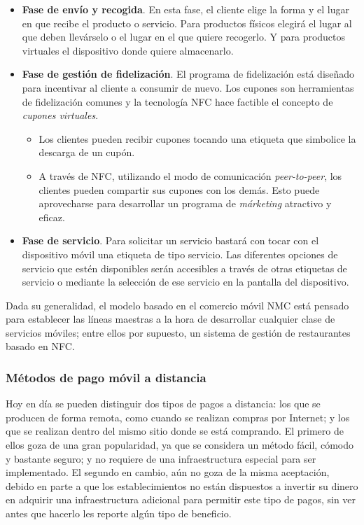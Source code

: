 \begin{itemize}
\begin{itemize}
    \end{itemize}
  \item \textbf{Fase de envío y recogida}. En esta fase, el cliente elige
  la forma y el lugar en que recibe el producto o servicio. Para productos
  físicos elegirá el lugar al que deben llevárselo o el lugar en el que quiere
  recogerlo. Y para productos virtuales el dispositivo donde quiere
  almacenarlo.
  \item \textbf{Fase de gestión de fidelización}. El programa de fidelización
  está diseñado para incentivar al cliente a consumir de nuevo. Los cupones son
  herramientas de fidelización comunes y la tecnología \acs{NFC} hace factible
  el concepto de \emph{cupones virtuales}.
    \begin{itemize}
    \item Los clientes pueden recibir cupones tocando una etiqueta que 
    simbolice la descarga de un cupón.
    \item A través de \acs{NFC}, utilizando el modo de comunicación
    \emph{peer-to-peer}, los clientes pueden compartir sus cupones con los
    demás. Esto puede aprovecharse para desarrollar un programa de
    \emph{márketing} atractivo y eficaz.
    \end{itemize}
  \item \textbf{Fase de servicio}. Para solicitar un servicio bastará con
  tocar con el dispositivo móvil una etiqueta de tipo servicio. Las diferentes
  opciones de servicio que estén disponibles serán accesibles a través de
  otras etiquetas de servicio o mediante la selección de ese servicio en la
  pantalla del dispositivo.
  \end{itemize}
  
  Dada su generalidad, el modelo basado en el comercio móvil \acs{NMC} está 
  pensado para establecer las líneas maestras a la hora de desarrollar 
  cualquier clase de servicios móviles; entre ellos por supuesto, un sistema
  de gestión de restaurantes basado en \acs{NFC}.

    \subsubsection{Métodos de pago móvil a distancia}
  Hoy en día se pueden distinguir dos tipos de pagos a distancia: los que se
  producen de forma remota, como cuando se realizan compras por Internet;
  y los que se realizan dentro del mismo sitio donde se está
  comprando. El primero de ellos goza de una gran popularidad, ya que se
  considera un método fácil, cómodo y bastante seguro; y no requiere de una
  infraestructura especial para ser implementado. El segundo en cambio,
  aún no goza de la misma aceptación, debido en parte a que los 
  establecimientos no están dispuestos a invertir su dinero en adquirir una 
  infraestructura adicional para permitir este tipo de pagos, sin ver antes 
  que hacerlo les reporte algún tipo de beneficio.

